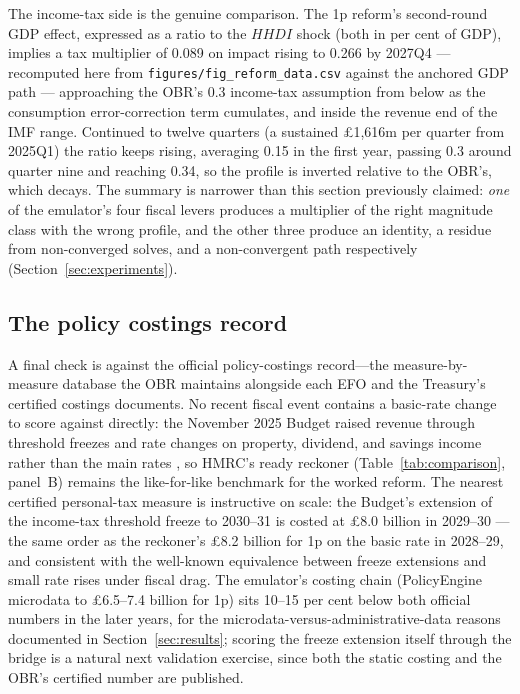 The income-tax side is the genuine comparison. The 1p reform's second-round GDP effect, expressed as a ratio to the $HHDI$ shock (both in per cent of GDP), implies a tax multiplier of 0.089 on impact rising to 0.266 by 2027Q4 --- recomputed here from \texttt{figures/fig\_reform\_data.csv} against the anchored GDP path --- approaching the OBR's 0.3 income-tax assumption from below as the consumption error-correction term cumulates, and inside the revenue end of the IMF range. Continued to twelve quarters (a sustained \pounds 1,616m per quarter from 2025Q1) the ratio keeps rising, averaging 0.15 in the first year, passing 0.3 around quarter nine and reaching 0.34, so the profile is inverted relative to the OBR's, which decays. The summary is narrower than this section previously claimed: \emph{one} of the emulator's four fiscal levers produces a multiplier of the right magnitude class with the wrong profile, and the other three produce an identity, a residue from non-converged solves, and a non-convergent path respectively (Section~\ref{sec:experiments}).

\subsection{The policy costings record}
\label{sec:costingsdb}

A final check is against the official policy-costings record---the measure-by-measure database the OBR maintains alongside each EFO and the Treasury's certified costings documents. No recent fiscal event contains a basic-rate change to score against directly: the November 2025 Budget raised revenue through threshold freezes and rate changes on property, dividend, and savings income rather than the main rates \citep{hmt2025costings}, so HMRC's ready reckoner (Table~\ref{tab:comparison}, panel~B) remains the like-for-like benchmark for the worked reform. The nearest certified personal-tax measure is instructive on scale: the Budget's extension of the income-tax threshold freeze to 2030--31 is costed at \pounds 8.0 billion in 2029--30 \citep{hmt2025costings, obr2025efo}---the same order as the reckoner's \pounds 8.2 billion for 1p on the basic rate in 2028--29, and consistent with the well-known equivalence between freeze extensions and small rate rises under fiscal drag. The emulator's costing chain (PolicyEngine microdata to \pounds 6.5--7.4 billion for 1p) sits 10--15 per cent below both official numbers in the later years, for the microdata-versus-administrative-data reasons documented in Section~\ref{sec:results}; scoring the freeze extension itself through the bridge is a natural next validation exercise, since both the static costing and the OBR's certified number are published.
